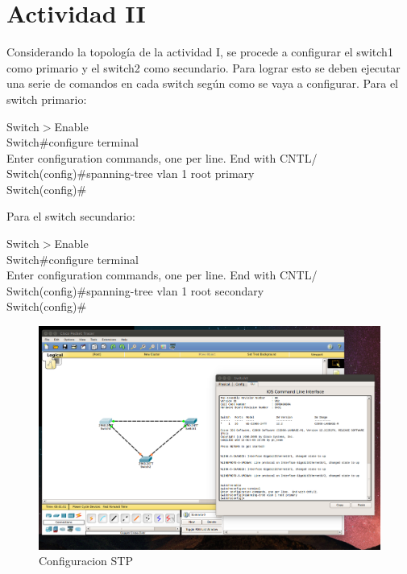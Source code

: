 \documentclass[spanish]{udpreport}
\begin{document}
\section{Actividad II}
Considerando la topología de la actividad I, se procede a configurar el switch1 como primario y el switch2 como secundario. Para lograr esto se deben ejecutar una serie de comandos en cada switch según como se vaya a configurar.
Para el switch primario:
\begin{flushleft}
	Switch$>$Enable \\
	Switch\#configure terminal \\
	Enter configuration commands, one per line. End with CNTL/ \\
	Switch(config)\#spanning-tree vlan 1 root primary \\
	Switch(config)\# \\
\end{flushleft}

Para el switch secundario:

\begin{flushleft}
	Switch$>$Enable \\
	Switch\#configure terminal\\
	Enter configuration commands, one per line. End with CNTL/\\
	Switch(config)\#spanning-tree vlan 1 root secondary\\
	Switch(config)\#\\
\end{flushleft}

\begin{figure}[H]
	\label{fig:Figura 2.2}
	\centering
	\includegraphics[scale=.25]{imagenes/A2_2e.png}
	\caption{Configuracion STP}
\end{figure}
\end{document}
